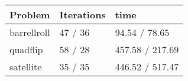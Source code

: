 \begin{tabular}{lll}
\toprule 
Problem & Iterations & time \\
\midrule 
barrellroll & 47 / 36 & 94.54 / 78.65 \\
quadflip & 58 / 28 & 457.58 / 217.69 \\
satellite & 35 / 35 & 446.52 / 517.47 \\
\bottomrule 
\end{tabular}
